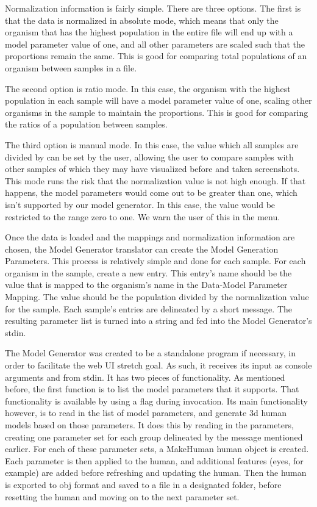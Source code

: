 \documentclass[letterpaper,10pt, onecolumn, draftclsnofoot]{IEEEtran}
\begin{document}
Normalization information is fairly simple. There are three options. The first is that the data is normalized in absolute mode, which means that only the organism that has the highest population in the entire file will end up with a model parameter value of one, and all other parameters are scaled such that the proportions remain the same. This is good for comparing total populations of an organism between samples in a file. 

The second option is ratio mode. In this case, the organism with the highest population in each sample will have a model parameter value of one, scaling other organisms in the sample to maintain the proportions. This is good for comparing the ratios of a population between samples. 

The third option is manual mode. In this case, the value which all samples are divided by can be set by the user, allowing the user to compare samples with other samples of which they may have visualized before and taken screenshots. This mode runs the risk that the normalization value is not high enough. If that happens, the model parameters would come out to be greater than one, which isn't supported by our model generator. In this case, the value would be restricted to the range zero to one. We warn the user of this in the menu.

Once the data is loaded and the mappings and normalization information are chosen, the Model Generator translator can create the Model Generation Parameters. This process is relatively simple and done for each sample. For each organism in the sample, create a new entry. This entry's name should be the value that is mapped to the organism's name in the Data-Model Parameter Mapping. The value should be the population divided by the normalization value for the sample. Each sample's entries are delineated by a short message. The resulting parameter list is turned into a string and fed into the Model Generator's stdin.

The Model Generator was created to be a standalone program if necessary, in order to facilitate the web UI stretch goal. As such, it receives its input as console arguments and from stdin. It has two pieces of functionality. As mentioned before, the first function is to list the model parameters that it supports. That functionality is available by using a flag during invocation. Its main functionality however, is to read in the list of model parameters, and generate 3d human models based on those parameters. It does this by reading in the parameters, creating one parameter set for each group delineated by the message mentioned earlier. For each of these parameter sets, a MakeHuman human object is created. Each parameter is then applied to the human, and additional features (eyes, for example) are added before refreshing and updating the human. Then the human is exported to obj format and saved to a file in a designated folder, before resetting the human and moving on to the next parameter set.
\end{document}
